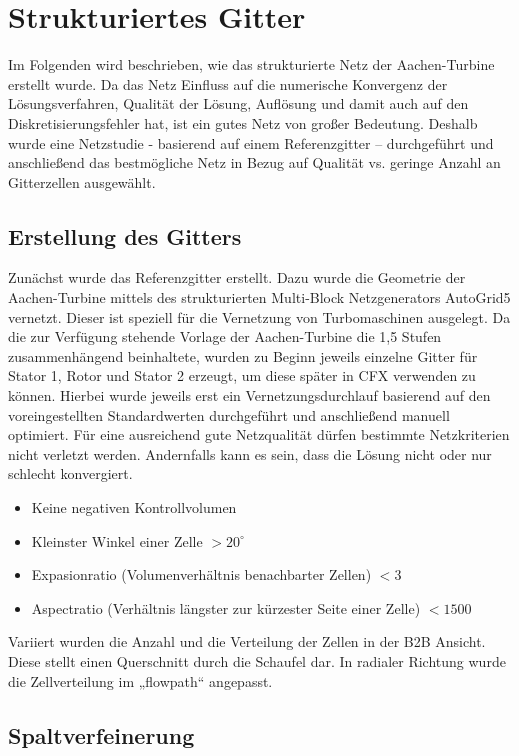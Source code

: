 \section{Strukturiertes Gitter}
Im Folgenden wird beschrieben, wie das strukturierte Netz der Aachen-Turbine erstellt wurde. Da das Netz Einfluss auf die numerische Konvergenz der Lösungsverfahren, Qualität der Lösung, Auflösung und damit auch auf den Diskretisierungsfehler hat, ist ein gutes Netz von großer Bedeutung. Deshalb wurde eine Netzstudie - basierend auf einem Referenzgitter – durchgeführt und anschließend das bestmögliche Netz in Bezug auf Qualität vs. geringe Anzahl an Gitterzellen ausgewählt. 

\subsection{Erstellung des Gitters}

Zunächst wurde das Referenzgitter erstellt. Dazu wurde die Geometrie der Aachen-Turbine mittels des strukturierten Multi-Block Netzgenerators AutoGrid5 vernetzt. Dieser ist speziell für die Vernetzung von Turbomaschinen ausgelegt. 
Da die zur Verfügung stehende Vorlage der Aachen-Turbine die 1,5 Stufen zusammenhängend beinhaltete, wurden zu Beginn jeweils einzelne Gitter für Stator 1, Rotor und Stator 2 erzeugt, um diese später in CFX verwenden zu können. Hierbei wurde jeweils erst ein Vernetzungsdurchlauf basierend auf den voreingestellten Standardwerten durchgeführt und anschließend manuell optimiert. Für eine ausreichend gute Netzqualität dürfen bestimmte Netzkriterien nicht verletzt werden. Andernfalls kann es sein, dass die Lösung nicht oder nur schlecht konvergiert.
\begin{itemize}
	\item Keine negativen Kontrollvolumen
	\item Kleinster Winkel einer Zelle $> 20^\circ$
	\item Expasionratio (Volumenverhältnis benachbarter Zellen) $< 3$
	\item Aspectratio (Verhältnis längster zur kürzester Seite einer Zelle) $< 1500$ 
\end{itemize}
Variiert wurden die Anzahl und die Verteilung der Zellen in der B2B Ansicht. Diese stellt einen Querschnitt durch die Schaufel dar. In radialer Richtung wurde die Zellverteilung im „flowpath“ angepasst. 

\subsection{Spaltverfeinerung}

